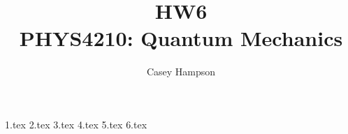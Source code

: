 \documentclass[titlepage]{article}
\title{HW6 \\[5pt] PHYS4210: Quantum Mechanics}
\author{Casey Hampson}
\begin{document}
    \maketitle
    \pagebreak

    {1.tex}
    {2.tex}
    {3.tex}
    {4.tex}
    {5.tex}
    {6.tex}
\end{document}

